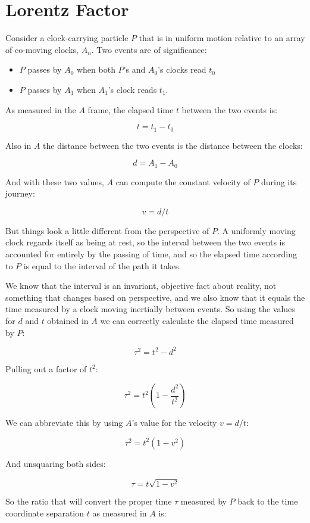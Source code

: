 \section{Lorentz Factor}

Consider a clock-carrying particle $P$ that is in uniform motion relative to an array of co-moving clocks, $A_n$. Two events are of significance:

\begin{itemize}
    \item $P$ passes by $A_0$ when both $P$'s and $A_0$'s clocks read $t_0$
    \item $P$ passes by $A_1$ when $A_1$'s clock reads $t_1$.
\end{itemize}

As measured in the $A$ frame, the elapsed time $t$ between the two events is:

$$t = t_1 - t_0$$

Also in $A$ the distance between the two events is the distance between the clocks:

$$d = A_1 - A_0$$

And with these two values, $A$ can compute the constant velocity of $P$ during its journey:

$$v = d/t$$

But things look a little different from the perspective of $P$. A uniformly moving clock regards itself as being at rest, so the interval between the two events is accounted for entirely by the passing of time, and so the elapsed time according to $P$ is equal to the interval of the path it takes.

We know that the interval is an invariant, objective fact about reality, not something that changes based on perspective, and we also know that it equals the time measured by a clock moving inertially between events. So using the values for $d$ and $t$ obtained in $A$ we can correctly calculate the elapsed time measured by $P$:

$$\tau^2 = t^2 - d^2$$

Pulling out a factor of $t^2$:

$$\tau^2 = t^2(1 - \frac{d^2}{t^2})$$

We can abbreviate this by using $A$'s value for the velocity $v = d/t$:

$$\tau^2 = t^2(1 - v^2)$$

And unsquaring both sides:

$$\tau = t\sqrt{1 - v^2}$$

So the ratio that will convert the proper time $\tau$ measured by $P$ back to the time coordinate separation $t$ as measured in $A$ is:

